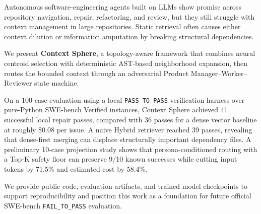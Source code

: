 Autonomous software-engineering agents built on LLMs show promise across repository navigation, repair, refactoring, and review, but they still struggle with context management in large repositories. Static retrieval often causes either context dilution or information amputation by breaking structural dependencies.

We present \textbf{Context Sphere}, a topology-aware framework that combines neural centroid selection with deterministic AST-based neighborhood expansion, then routes the bounded context through an adversarial Product Manager--Worker--Reviewer state machine.

On a 100-case evaluation using a local \texttt{PASS\_TO\_PASS} verification harness over pure-Python SWE-bench Verified instances, Context Sphere achieved 41 successful local repair passes, compared with 36 passes for a dense vector baseline at roughly \$0.08 per issue. A naive Hybrid retriever reached 39 passes, revealing that dense-first merging can displace structurally important dependency files. A preliminary 10-case projection study shows that persona-conditioned routing with a Top-K safety floor can preserve 9/10 known successes while cutting input tokens by 71.5\% and estimated cost by 58.4\%.

We provide public code, evaluation artifacts, and trained model checkpoints to support reproducibility and position this work as a foundation for future official SWE-bench \texttt{FAIL\_TO\_PASS} evaluation.

